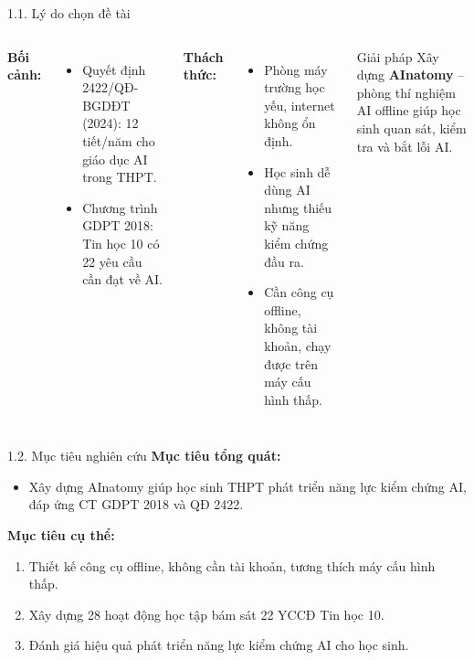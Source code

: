 \documentclass[10pt, aspectratio=169]{beamer}
\begin{document}
\begin{frame}{1.1. Lý do chọn đề tài}
    \begin{columns}
        \textbf{Bối cảnh:}
        \begin{itemize}
            \item Quyết định 2422/QĐ-BGDĐT (2024): 12 tiết/năm cho giáo dục AI trong THPT.
            \item Chương trình GDPT 2018: Tin học 10 có 22 yêu cầu cần đạt về AI.
        \end{itemize}
        \vspace{0.5em}
        \textbf{Thách thức:}
        \begin{itemize}
            \item Phòng máy trường học yếu, internet không ổn định.
            \item Học sinh dễ dùng AI nhưng thiếu kỹ năng kiểm chứng đầu ra.
            \item Cần công cụ offline, không tài khoản, chạy được trên máy cấu hình thấp.
        \end{itemize}
        \begin{block}{Giải pháp}
            Xây dựng \textbf{AInatomy} -- phòng thí nghiệm AI offline giúp học sinh quan sát, kiểm tra và bắt lỗi AI.
        \end{block}
    \end{columns}
\end{frame}

\begin{frame}{1.2. Mục tiêu nghiên cứu}
    \textbf{Mục tiêu tổng quát:}
    \begin{itemize}
        \item Xây dựng AInatomy giúp học sinh THPT phát triển năng lực kiểm chứng AI, đáp ứng CT GDPT 2018 và QĐ 2422.
    \end{itemize}
    \vspace{0.5em}
    \textbf{Mục tiêu cụ thể:}
    \begin{enumerate}
        \item Thiết kế công cụ offline, không cần tài khoản, tương thích máy cấu hình thấp.
        \item Xây dựng 28 hoạt động học tập bám sát 22 YCCĐ Tin học 10.
        \item Đánh giá hiệu quả phát triển năng lực kiểm chứng AI cho học sinh.
    \end{enumerate}
\end{frame}
\end{document}
